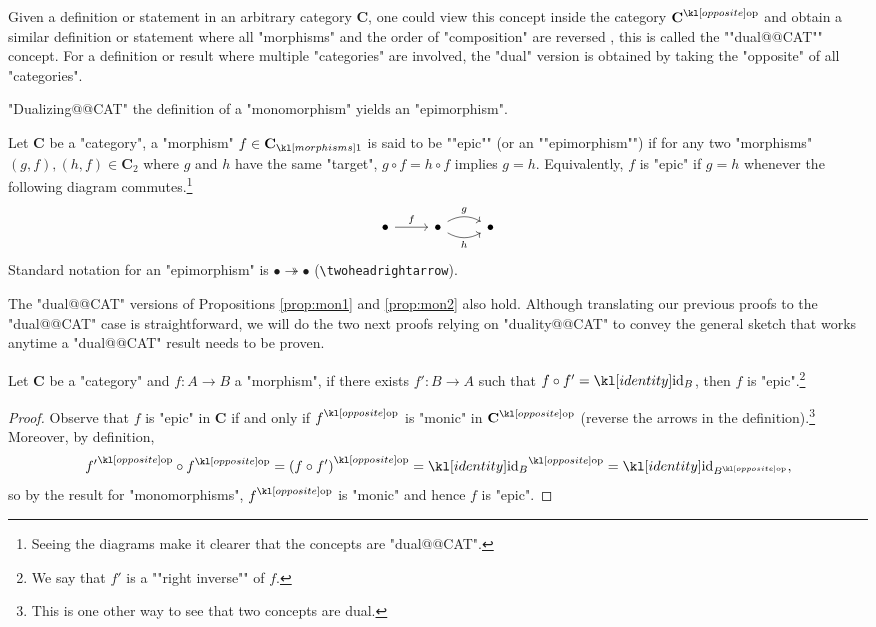 \documentclass[main.tex]{subfiles}
\begin{document}
\begin{defn}[Duality]
	Given a definition or statement in an arbitrary category $\mathbf{C}$, one could view this concept inside the category $\op{\mathbf{C}}$ and obtain a similar definition or statement where all "morphisms" and the order of "composition" are reversed , this is called the ""dual@@CAT"" concept. For a definition or result where multiple "categories" are involved, the "dual" version is obtained by taking the "opposite" of all "categories".
\end{defn}
"Dualizing@@CAT" the definition of a "monomorphism" yields an "epimorphism".
\begin{defn}[Epimorphism]
	Let $\mathbf{C}$ be a "category", a "morphism" $f \in \mor{\mathbf{C}}$ is said to be ""epic"" (or an ""epimorphism"") if for any two "morphisms" $(g,f), (h,f) \in \mathbf{C}_2$ where $g$ and $h$ have the same "target", $g\circ f = h\circ f$ implies $g = h$. Equivalently, $f$ is "epic" if $g = h$ whenever the following diagram commutes.\footnote{Seeing the diagrams make it clearer that the concepts are "dual@@CAT".}
	\begin{equation}
	\begin{tikzcd}
	\bullet \arrow[r, "f"] & \bullet \arrow[r, "g", bend left] \arrow[r, "h"', bend right] & \bullet
	\end{tikzcd}
	\end{equation}
	Standard notation for an "epimorphism" is $ \bullet \twoheadrightarrow \bullet$ (\verb!\twoheadrightarrow!).
\end{defn}
The "dual@@CAT" versions of Propositions \ref{prop:mon1} and \ref{prop:mon2} also hold. Although translating our previous proofs to the "dual@@CAT" case is straightforward, we will do the two next proofs relying on "duality@@CAT" to convey the general sketch that works anytime a "dual@@CAT" result needs to be proven.
\begin{prop}\label{prop:ep1}
	Let $\mathbf{C}$ be a "category" and $f:A\rightarrow B$ a "morphism", if there exists $f': B\rightarrow A$ such that $f\circ f' = \id_B$, then $f$ is "epic".\footnote{\AP We say that $f'$ is a ""right inverse"" of $f$.}%
\end{prop}
\begin{proof}
	Observe that $f$ is "epic" in $\mathbf{C}$ if and only if $\op{f}$ is "monic" in $\op{\mathbf{C}}$ (reverse the arrows in the definition).\footnote{This is one other way to see that two concepts are dual.} Moreover, by definition, \[\op{f'} \circ \op{f} = \op{(f \circ f')} = \op{\id_B} = \id_{\op{B}},\] so by the result for "monomorphisms", $\op{f}$ is "monic" and hence $f$ is "epic". 
\end{proof}
\end{document}
